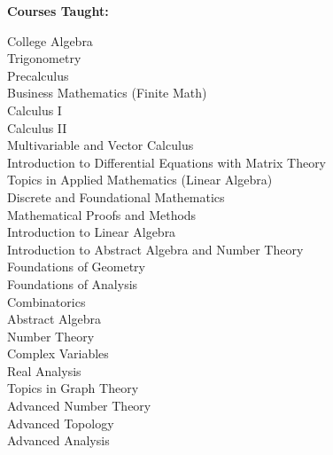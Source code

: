 \documentclass[12pt]{article}
\begin{document}
\textbf{Courses Taught:}

College Algebra \\
Trigonometry \\
Precalculus \\
Business Mathematics (Finite Math) \\
Calculus I \\
Calculus II \\
Multivariable and Vector Calculus \\
Introduction to Differential Equations with Matrix Theory \\
Topics in Applied Mathematics (Linear Algebra) \\
Discrete and Foundational Mathematics \\
Mathematical Proofs and Methods \\
Introduction to Linear Algebra \\
Introduction to Abstract Algebra and Number Theory \\
Foundations of Geometry \\
Foundations of Analysis \\
Combinatorics \\
Abstract Algebra \\
Number Theory \\
Complex Variables \\
Real Analysis \\
Topics in Graph Theory \\
Advanced Number Theory \\
Advanced Topology \\
Advanced Analysis \\





\end{document}
